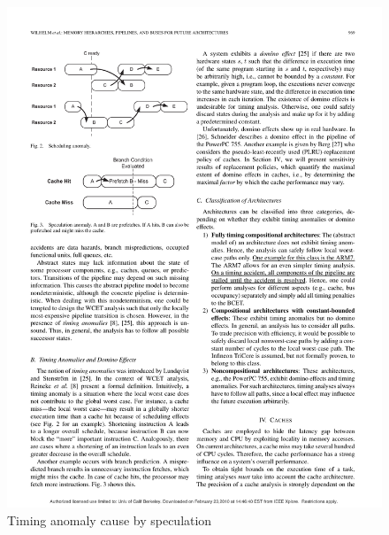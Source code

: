 \begin{figure}
  \vspace{-20pt}
  \begin{center}
    \includegraphics{figs/speculation_anomaly}
  \end{center}
  \vspace{-10pt}
  \caption{Timing anomaly cause by speculation~\cite{Reineke06adefinition}}
  \label{fig:speculation_anomaly}
  \vspace{-10pt}
\end{figure}
